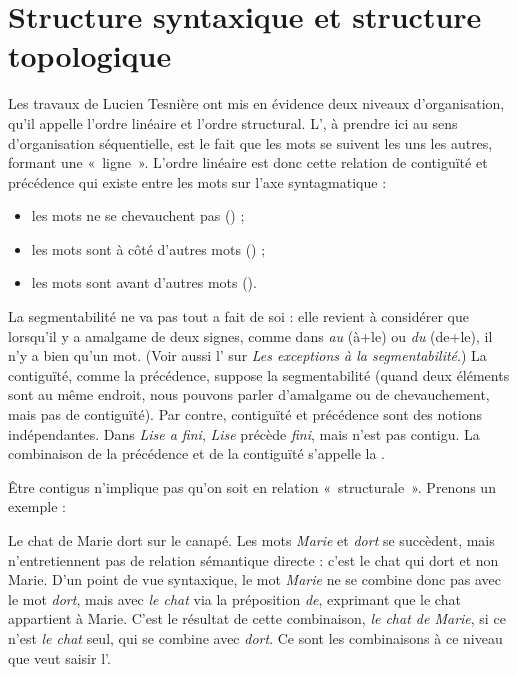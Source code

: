 \section{Structure syntaxique et structure topologique}\label{sec:3.2.6}

Les travaux de Lucien Tesnière ont mis en évidence deux niveaux d’organisation, qu’il appelle l’ordre linéaire et l’ordre structural. L’, à prendre ici au sens d’organisation séquentielle, est le fait que les mots se suivent les uns les autres, formant une «~ligne~». L’ordre linéaire est donc cette relation de contiguïté et précédence qui existe entre les mots sur l’axe syntagmatique :

\begin{itemize}
\item les mots ne se chevauchent pas () ;
\item les mots sont à côté d’autres mots () ;
\item les mots sont avant d’autres mots ().
\end{itemize}

La segmentabilité ne va pas tout a fait de soi : elle revient à considérer que lorsqu’il y a amalgame de deux signes, comme dans \textit{au} (à+le) ou \textit{du} (de+le), il n’y a bien qu’un mot. (Voir aussi l’ sur \textit{Les exceptions à la segmentabilité}.) La contiguïté, comme la précédence, suppose la segmentabilité (quand deux éléments sont au même endroit, nous pouvons parler d’amalgame ou de chevauchement, mais pas de contiguïté). Par contre, contiguïté et précédence sont des notions indépendantes. Dans \textit{Lise a fini}, \textit{Lise} précède \textit{fini}, mais n’est pas contigu. La combinaison de la précédence et de la contiguïté s’appelle la .

Être contigus n’implique pas qu’on soit en relation «~structurale~». Prenons un exemple :

\ea
{Le chat de Marie dort sur le canapé}.
\z
Les mots \textit{Marie} et \textit{dort} se succèdent, mais n’entretiennent pas de relation sémantique directe : c’est le chat qui dort et non Marie. D’un point de vue syntaxique, le mot \textit{Marie} ne se combine donc pas avec le mot \textit{dort}, mais avec \textit{le chat} via la préposition \textit{de}, exprimant que le chat appartient à Marie. C’est le résultat de cette combinaison, \textit{le chat de Marie}, si ce n’est \textit{le chat} seul, qui se combine avec \textit{dort}. Ce sont les combinaisons à ce niveau que veut saisir l’.

